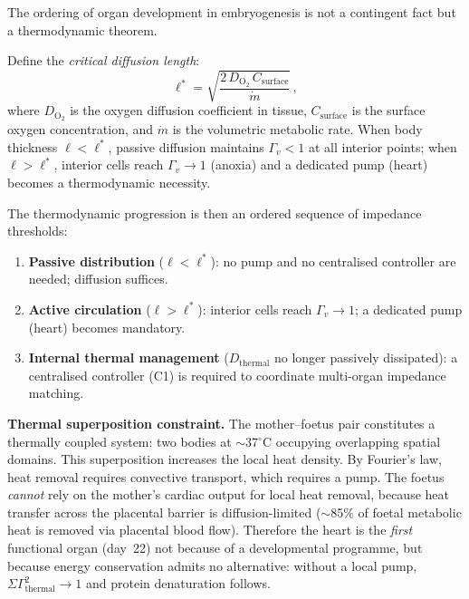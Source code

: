 \documentclass[aps,pre,twocolumn,superscriptaddress,floatfix]{revtex4-2}
\begin{document}
\begin{remark}
\label{rem:embryonic-c123-order}
The ordering of organ development in embryogenesis
is not a contingent fact but a thermodynamic theorem.

Define the \emph{critical diffusion length}:
\begin{equation}
  \ell^* = \sqrt{\frac{2\,D_{\mathrm{O}_2}\,
      C_{\mathrm{surface}}}{\dot{m}}}\,,
  \label{eq:critical-length}
\end{equation}
where $D_{\mathrm{O}_2}$ is the oxygen diffusion
coefficient in tissue, $C_{\mathrm{surface}}$ is the
surface oxygen concentration, and $\dot{m}$ is the
volumetric metabolic rate.
When body thickness $\ell < \ell^*$, passive diffusion
maintains $\Gamma_v < 1$ at all interior points;
when $\ell > \ell^*$, interior cells reach
$\Gamma_v \to 1$ (anoxia) and a dedicated pump
(heart) becomes a thermodynamic necessity.

The thermodynamic progression is then an ordered
sequence of impedance thresholds:
\begin{enumerate}
  \item \textbf{Passive distribution}
    ($\ell < \ell^*$):
    no pump and no centralised controller are
    needed; diffusion suffices.
  \item \textbf{Active circulation}
    ($\ell > \ell^*$):
    interior cells reach $\Gamma_v \to 1$;
    a dedicated pump (heart) becomes mandatory.
  \item \textbf{Internal thermal management}
    ($D_{\mathrm{thermal}}$ no longer passively
     dissipated):
    a centralised controller (C1) is required to
    coordinate multi-organ impedance matching.
\end{enumerate}

\textbf{Thermal superposition constraint.}
The mother--foetus pair constitutes a thermally
coupled system: two bodies at $\sim$37$^\circ$C
occupying overlapping spatial domains.
This superposition increases the local heat density.
By Fourier's law, heat removal requires convective
transport, which requires a pump.
The foetus \emph{cannot} rely on the mother's
cardiac output for local heat removal, because
heat transfer across the placental barrier is
diffusion-limited ($\sim$85\% of foetal metabolic
heat is removed via placental blood flow).
Therefore the heart is the \emph{first} functional
organ (day~22) not because of a developmental
programme, but because energy conservation admits
no alternative: without a local pump,
$\Sigma\Gamma^2_{\mathrm{thermal}} \to 1$ and
protein denaturation follows.


\end{remark}
\end{document}
